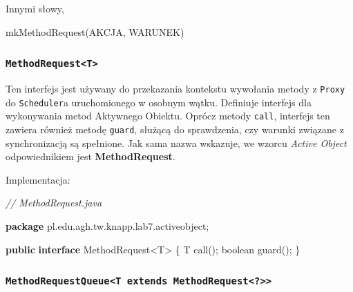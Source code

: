 \documentclass[11pt]{article}
\newenvironment{Shaded}{}{}
\newcommand{\KeywordTok}[1]{\textcolor[rgb]{0.00,0.44,0.13}{\textbf{{#1}}}}
\newcommand{\DataTypeTok}[1]{\textcolor[rgb]{0.56,0.13,0.00}{{#1}}}
\newcommand{\CommentTok}[1]{\textcolor[rgb]{0.38,0.63,0.69}{\textit{{#1}}}}
\newcommand{\FunctionTok}[1]{\textcolor[rgb]{0.02,0.16,0.49}{{#1}}}
\newcommand{\NormalTok}[1]{{#1}}
\newcommand{\ImportTok}[1]{{#1}}
\newcommand{\OperatorTok}[1]{\textcolor[rgb]{0.40,0.40,0.40}{{#1}}}
\begin{document}
Innymi słowy,

\begin{Shaded}
\begin{Highlighting}[]
\FunctionTok{mkMethodRequest}\OperatorTok{(}\NormalTok{AKCJA}\OperatorTok{,}\NormalTok{ WARUNEK}\OperatorTok{)}
\end{Highlighting}
\end{Shaded}

    \hypertarget{methodrequestt}{%
\subsubsection{\texorpdfstring{\texttt{MethodRequest\textless{}T\textgreater{}}}{MethodRequest\textless T\textgreater{}}}\label{methodrequestt}}

Ten interfejs jest używany do przekazania kontekstu wywołania metody z
\texttt{Proxy} do \texttt{Scheduler}a uruchomionego w osobnym wątku.
Definiuje interfejs dla wykonywania metod Aktywnego Obiektu. Oprócz
metody \texttt{call}, interfejs ten zawiera również metodę
\texttt{guard}, służącą do sprawdzenia, czy warunki związane z
synchronizacją są spełnione. Jak sama nazwa wskazuje, we wzorcu
\emph{Active Object} odpowiednikiem jest \textbf{MethodRequest}.

Implementacja:

\begin{Shaded}
\begin{Highlighting}[]
\CommentTok{// MethodRequest.java}

\KeywordTok{package}\ImportTok{ pl}\OperatorTok{.}\ImportTok{edu}\OperatorTok{.}\ImportTok{agh}\OperatorTok{.}\ImportTok{tw}\OperatorTok{.}\ImportTok{knapp}\OperatorTok{.}\ImportTok{lab7}\OperatorTok{.}\ImportTok{activeobject}\OperatorTok{;}

\KeywordTok{public} \KeywordTok{interface}\NormalTok{ MethodRequest}\OperatorTok{\textless{}}\NormalTok{T}\OperatorTok{\textgreater{}} \OperatorTok{\{}
\NormalTok{    T }\FunctionTok{call}\OperatorTok{();}
    \DataTypeTok{boolean} \FunctionTok{guard}\OperatorTok{();}
\OperatorTok{\}}
\end{Highlighting}
\end{Shaded}

    \hypertarget{methodrequestqueuet-extends-methodrequest}{%
\subsubsection{\texorpdfstring{\texttt{MethodRequestQueue\textless{}T\ extends\ MethodRequest\textless{}?\textgreater{}\textgreater{}}}{MethodRequestQueue\textless T extends MethodRequest\textless?\textgreater\textgreater{}}}\label{methodrequestqueuet-extends-methodrequest}}
\end{document}
